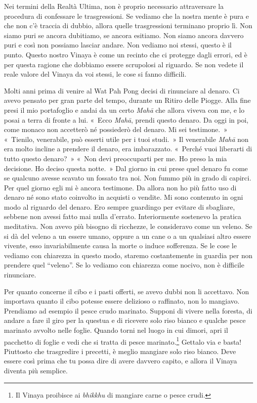 Nei termini della Realtà Ultima, non è proprio necessario attraversare
la procedura di confessare le trasgressioni. Se vediamo che la nostra
mente è pura e che non c'è traccia di dubbio, allora quelle
trasgressioni terminano proprio lì. Non siamo puri se ancora dubitiamo,
se ancora esitiamo. Non siamo ancora davvero puri e così non possiamo
lasciar andare. Non vediamo noi stessi, questo è il punto. Questo nostro
Vinaya è come un recinto che ci protegge dagli errori, ed è per questa
ragione che dobbiamo essere scrupolosi al riguardo. Se non vedete il
reale valore del Vinaya da voi stessi, le cose si fanno difficili.

Molti anni prima di venire al Wat Pah Pong decisi di rinunciare al
denaro. Ci avevo pensato per gran parte del tempo, durante un Ritiro
delle Piogge. Alla fine presi il mio portafoglio e andai da un certo
\emph{Mahā} che allora viveva con me, e lo posai a terra di fronte a
lui. «~Ecco \emph{Mahā}, prendi questo denaro. Da oggi in poi, come
monaco non accetterò né possiederò del denaro. Mi sei testimone.~»
«~Tienilo, venerabile, può esserti utile per i tuoi studi.~» Il
venerabile \emph{Mahā} non era molto incline a prendere il denaro, era
imbarazzato. «~Perché vuoi liberarti di tutto questo denaro?~» «~Non
devi preoccuparti per me. Ho preso la mia decisione. Ho deciso questa
notte.~» Dal giorno in cui prese quel denaro fu come se qualcuno avesse
scavato un fossato tra noi. Non fummo più in grado di capirci. Per quel
giorno egli mi è ancora testimone. Da allora non ho più fatto uso di
denaro né sono stato coinvolto in acquisti o vendite. Mi sono contenuto
in ogni modo al riguardo del denaro. Ero sempre guardingo per evitare di
sbagliare, sebbene non avessi fatto mai nulla d'errato. Interiormente
sostenevo la pratica meditativa. Non avevo più bisogno di ricchezze, le
consideravo come un veleno. Se si dà del veleno a un essere umano,
oppure a un cane o a un qualsiasi altro essere vivente, esso
invariabilmente causa la morte o induce sofferenza. Se le cose le
vediamo con chiarezza in questo modo, staremo costantemente in guardia
per non prendere quel ``veleno''. Se lo vediamo con chiarezza come
nocivo, non è difficile rinunciare.

Per quanto concerne il cibo e i pasti offerti, se avevo dubbi non li
accettavo. Non importava quanto il cibo potesse essere delizioso o
raffinato, non lo mangiavo. Prendiamo ad esempio il pesce crudo
marinato. Supponi di vivere nella foresta, di andare a fare il giro per
la questua e di ricevere solo riso bianco e qualche pesce marinato
avvolto nelle foglie. Quando torni nel luogo in cui dimori, apri il
pacchetto di foglie e vedi che si tratta di pesce marinato.\footnote{Il
  Vinaya proibisce ai \emph{bhikkhu} di mangiare carne o pesce crudi.}
Gettalo via e basta! Piuttosto che trasgredire i precetti, è meglio
mangiare solo riso bianco. Deve essere così prima che tu possa dire di
avere davvero capito, e allora il Vinaya diventa più semplice.

